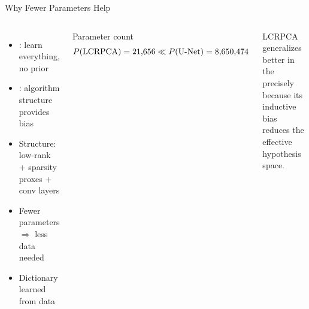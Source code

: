\begin{frame}{Why Fewer Parameters Help}

  \begin{columns}[T]
      \vspace{0.3em}
      \begin{itemize}
        \item {}: learn everything, no prior
        \pause
        \item {}: algorithm structure provides bias
        \pause
        \item Structure: low-rank + sparsity proxes + conv layers
        \pause
        \item Fewer parameters $\Rightarrow$ less data needed
        \pause
        \item Dictionary learned from data
      \end{itemize}

      \vspace{0.3em}
      \begin{shibuiframe}{Parameter count}
        \[
          P(\mathrm{LCRPCA})
            = 21{,}656
            \ll
          P(\mathrm{U\text{-}Net})
            = 8{,}650{,}474
        \]
      \end{shibuiframe}

      \vspace{0.6em}
      \begin{shibuitip}
        LCRPCA generalizes better in the
         precisely
        because its inductive bias reduces
        the effective hypothesis space.
      \end{shibuitip}
  \end{columns}
\end{frame}

